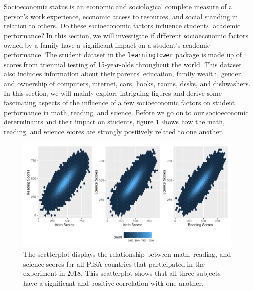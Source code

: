 Socioeconomic status is an economic and sociological complete measure of
a person's work experience, economic access to resources, and social
standing in relation to others. Do these socioeconomic factors influence
students' academic performance? In this section, we will investigate if
different socioeconomic factors owned by a family have a significant
impact on a student's academic performance. The student dataset in the
\texttt{learningtower} package is made up of scores from triennial
testing of 15-year-olds throughout the world. This dataset also includes
information about their parents' education, family wealth, gender, and
ownership of computers, internet, cars, books, rooms, desks, and
dishwashers. In this section, we will mainly explore intriguing figures
and derive some fascinating aspects of the influence of a few
socioeconomic factors on student performance in math, reading, and
science. Before we go on to our socioeconomic determinants and their
impact on students, figure \ref{fig:corr-plot} shows how the math,
reading, and science scores are strongly positively related to one
another.

\begin{Schunk}
\begin{figure}[H]
\includegraphics[width=1\linewidth]{learningtower_files/figure-latex/corr-plot-1} \caption[The scatterplot displays the relationship between math, reading, and science scores for all PISA countries that participated in the experiment in 2018]{The scatterplot displays the relationship between math, reading, and science scores for all PISA countries that participated in the experiment in 2018. This scatterplot shows that all three subjects have a significant and positive correlation with one another.}\label{fig:corr-plot}
\end{figure}
\end{Schunk}

